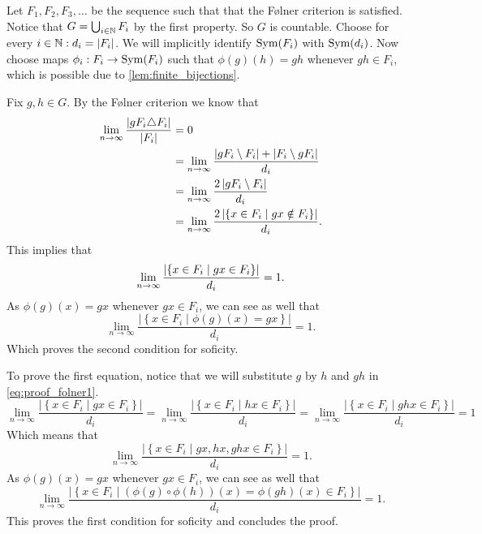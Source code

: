Let $F_1, F_2, F_3, \dots $ be the sequence such that that the Følner criterion is satisfied. Notice that $G = \bigcup_{i \in \mathbb{N}} F_i$ by the first property. So $G$ is countable. 
Choose for every $i \in \mathbb{N}: d_i = |F_i|$. We will implicitly identify $\operatorname{Sym}(F_i)$ with $\operatorname{Sym}(d_i)$. Now choose maps $\phi_i: F_i \to \operatorname{Sym}(F_i)$ such that $\phi(g)(h) = gh$ whenever $gh \in F_i$, which is possible due to \cref{lem:finite_bijections}. 

Fix $g, h \in G$. By the Følner criterion we know that 
\begin{align*}
    \lim_{n\to \infty} \frac{\left| gF_i \triangle F_i \right|}{\left| F_i \right|} &= 0\\
    &= \lim_{n\to \infty} \frac{\left| gF_i \setminus F_i \right| + \left| F_i \setminus gF_i \right|}{d_i}\\
    &= \lim_{n\to \infty} \frac{2\left|  gF_i \setminus F_i  \right|}{d_i}\\
    &= \lim_{n\to \infty} \frac{2\left| \left\{ x \in F_i \mid gx \notin F_i \right\} \right|}{d_i}. 
\end{align*}
This implies that \begin{equation}\label{eq:proof_folner1}
    \lim_{n\to \infty} \frac{\left| \left\{ x \in F_i \mid gx \in F_i \right\} \right|}{d_i} = 1.
\end{equation}
As $\phi(g)(x) = gx$ whenever $gx \in F_i$, we can see as well that $$\lim_{n\to \infty} \frac{\left|\left\{ x \in F_i \mid \phi(g)(x) = gx \right\}\right|}{d_i} = 1.$$
Which proves the second condition for soficity. 

To prove the first equation, notice that we will substitute $g$ by $h$ and $gh$ in \cref{eq:proof_folner1}.
$$ \lim_{n\to \infty} \frac{\left|\left\{ x \in F_i \mid gx \in F_i \right\}\right|}{d_i} =
\lim_{n\to \infty} \frac{\left|\left\{ x \in F_i \mid hx \in F_i \right\}\right|}{d_i} =
\lim_{n\to \infty} \frac{\left|\left\{ x \in F_i \mid ghx \in F_i \right\}\right|}{d_i}= 1$$
Which means that 
$$\lim_{n\to \infty} \frac{\left|\left\{ x \in F_i \mid gx,hx,ghx \in F_i \right\}\right|}{d_i}= 1.$$
As $\phi(g)(x) = gx$ whenever $gx \in F_i$, we can see as well that
$$\lim_{n\to \infty} \frac{\left|\left\{ x \in F_i \mid (\phi(g) \circ\phi(h))(x) = \phi(gh)(x) \in F_i \right\}\right|}{d_i}= 1.$$
This proves the first condition for soficity and concludes the proof. 
